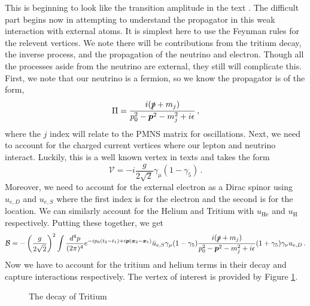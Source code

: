 \documentclass[10pt]{article}
\begin{document}
This is beginning to look like the transition amplitude in the text \cite{Akhmedov_2008}. The difficult part begins now in attempting to understand the propagator in this weak interaction with external atoms. It is simplest here to use the Feynman rules for the relevent vertices. We note there will be contributions from the tritium decay, the inverse process, and the propagation of the neutrino and electron. Though all the processes aside from the neutrino are external, they still will complicate this. First, we note that our neutrino is a fermion, so we know the propagator is of the form,
\begin{equation}
  \Pi = \frac{i(\slashed{p} + m_j)}{p_{0}^{2}-\bm{p}^{2} - m_{j}^{2} + i\epsilon}\, ,
\end{equation}
where the $j$ index will relate to the PMNS matrix for oscillations. Next, we need to account for the charged current vertices where our lepton and neutrino interact. Luckily, this is a well known vertex in texts \cite{ew_lec} and takes the form
\begin{equation}
  \mathcal{V} = -i\frac{g}{2\sqrt{2}}\gamma_{\mu}(1 - \gamma_{5}) \, .
\end{equation}
Moreover, we need to account for the external electron as a Dirac spinor using $u_{e,D}$ and $u_{e,S}$ where the first index is for the electron and the second is for the location. We can similarly account for the Helium and Tritium with $u_{\text{He}}$ and $u_{\text{H}}$ respectively. Putting these together, we get
\begin{equation}
  \mathcal{B} = -\left(\frac{g}{2\sqrt{2}}\right)^{2}\int \frac{d^{4}p}{(2\pi)^{4}}e^{-ip_{0}(t_{2} - t_{1}) + i\bm{p}(\bm{x}_{2} - \bm{x}_{1})}\bar{u}_{e,S}\gamma_{\mu}(1-\gamma_{5})\frac{i(\slashed{p} + m_j)}{p_{0}^{2}-\bm{p}^{2} - m_{j}^{2} + i\epsilon}(1 + \gamma_{5})\gamma_{\nu}u_{e,D} \, .
\end{equation}
Now we have to account for the tritium and helium terms in their decay and capture interactions respectively. The vertex of interest is provided by Figure \ref{fig:decay}.

\begin{figure}[h]
  \centering
  \caption{The decay of Tritium}
  \label{fig:decay}
\end{figure}
\end{document}
